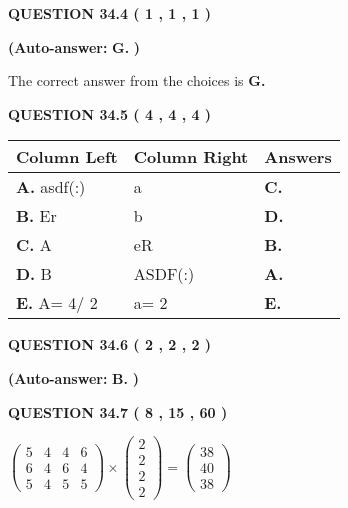 \documentclass[12pt]{article}
\begin{document}
 
  
  
{\textbf{\large{QUESTION
34.4 
 (           1 ,           1 ,           1 )
}}}
 
 
{\textbf{(Auto-answer:}}
{\textbf{\large{
G.}}}
{\textbf{)}}
 
 

The correct answer from the choices is
{\textbf{\large{
G.}}}
 
  
  
{\textbf{\large{QUESTION
34.5 
 (           4 ,           4 ,           4 )
}}}
 
 
\noindent{}
  
  
\begin{tabular}{|l|l|l|}
 \hline
 Column Left & Column Right  & Answers       \\ 
 \hline
{\textbf{\large{
A.}}}
asdf(:)
  & 
a
 & 
{\textbf{\large{
C.}}}
 \\ 
 \hline
{\textbf{\large{
B.}}}
Er
  & 
b
 & 
{\textbf{\large{
D.}}}
 \\ 
 \hline
{\textbf{\large{
C.}}}
A
  & 
eR
 & 
{\textbf{\large{
B.}}}
 \\ 
 \hline
{\textbf{\large{
D.}}}
B
  & 
ASDF(:)
 & 
{\textbf{\large{
A.}}}
 \\ 
 \hline
{\textbf{\large{
E.}}}
 A= %
4/ %
2

  & 
 a= %
2
 & 
{\textbf{\large{
E.}}}
 \\ 
 \hline
 \end{tabular}
  
  
\noindent{}
 
 
  
  
{\textbf{\large{QUESTION
34.6 
 (           2 ,           2 ,           2 )
}}}
 
 
{\textbf{(Auto-answer:}}
{\textbf{\large{
B.}}}
{\textbf{)}}
 
 
  
  
{\textbf{\large{QUESTION
34.7 
 (           8 ,          15 ,          60 )
}}}

 
$\left( \begin{array}{ccccccccccccccc}
           5  & 
           4  & 
           4  & 
           6  \\ 
           6  & 
           4  & 
           6  & 
           4  \\ 
           5  & 
           4  & 
           5  & 
           5
\end{array}\right) \times
\left( \begin{array}{c}
           2  \\ 
           2  \\ 
           2  \\ 
           2
\end{array}\right)  =
\left( \begin{array}{c}
          38  \\ 
          40  \\ 
          38
\end{array}\right)  $
 
\end{document}
